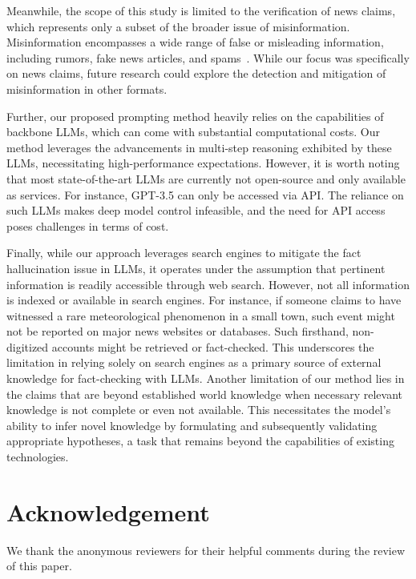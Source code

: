 \documentclass[11pt]{article}
\begin{document}
Meanwhile,  the scope of this study is limited to the verification of news claims, which represents only a subset of the broader issue of misinformation. Misinformation encompasses a wide range of false or misleading information, including rumors, fake news articles, and spams~\cite{wu2019misinformation}. While our focus was specifically on news claims, future research could explore the detection and mitigation of misinformation in other formats.

Further, our proposed prompting method heavily relies on the capabilities of backbone LLMs, which can come with substantial computational costs. Our method leverages the advancements in multi-step reasoning exhibited by these LLMs, necessitating high-performance expectations. However, it is worth noting that most state-of-the-art LLMs are currently not open-source and only available as services. For instance, GPT-3.5 can only be accessed via API. The reliance on such LLMs makes deep model control infeasible, and the need for API access poses challenges in terms of cost.

Finally, while our approach leverages search engines to mitigate the fact hallucination issue in LLMs, it operates under the assumption that pertinent information is readily accessible through web search. However, not all information is indexed or available in search engines. For instance, if someone claims to have witnessed a rare meteorological phenomenon in a small town, such event might not be reported on major news websites or databases. Such firsthand, non-digitized accounts might be retrieved or fact-checked. This underscores the limitation in relying solely on search engines as a primary source of external knowledge for fact-checking with LLMs. Another limitation of our method lies in the claims that are beyond established world knowledge when necessary relevant knowledge is not complete or even not available. This necessitates the model's ability to infer novel knowledge by formulating and subsequently validating appropriate hypotheses, a task that remains beyond the capabilities of existing technologies.

\section*{Acknowledgement}
We thank the anonymous reviewers for their helpful comments during the review of this paper.

\newpage



\newpage
\end{document}
